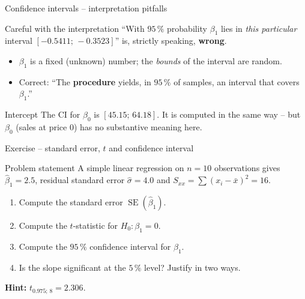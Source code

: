\documentclass[aspectratio=169,11pt]{beamer}
\begin{document}
\begin{frame}{Confidence intervals -- interpretation pitfalls}
  \begin{alertblock}{Careful with the interpretation}
    ``With $95\,\%$ probability $\beta_1$ lies in \emph{this particular}
    interval $[-0.5411;\,-0.3523]$'' is, strictly speaking, \textbf{wrong}.
  \end{alertblock}
  \begin{itemize}\setlength{\itemsep}{3pt}
    \item $\beta_1$ is a fixed (unknown) number; the \emph{bounds} of the
          interval are random.
    \item Correct: ``The \textbf{procedure} yields, in $95\,\%$ of samples,
          an interval that covers $\beta_1$.''
  \end{itemize}
  \begin{block}{Intercept}
    The CI for $\beta_0$ is $[45.15;\,64.18]$. It is computed in the same
    way -- but $\beta_0$ (sales at price $0$) has no substantive meaning
    here.
  \end{block}
\end{frame}

\begin{frame}{Exercise -- standard error, $t$ and confidence interval}
  \begin{block}{Problem statement}
    A simple linear regression on $n=10$ observations gives
    $\hat\beta_1 = 2.5$, residual standard error $\hat\sigma=4.0$ and
    $S_{xx}=\sum(x_i-\bar x)^2 = 16$.
    \begin{enumerate}
      \item Compute the standard error $\operatorname{SE}(\hat\beta_1)$.
      \item Compute the $t$-statistic for $H_0:\beta_1=0$.
      \item Compute the $95\,\%$ confidence interval for $\beta_1$.
      \item Is the slope significant at the $5\,\%$ level? Justify in two
            ways.
    \end{enumerate}
  \end{block}
  \textbf{Hint:} $t_{0.975;\,8}=2.306$.
\end{frame}
\end{document}
